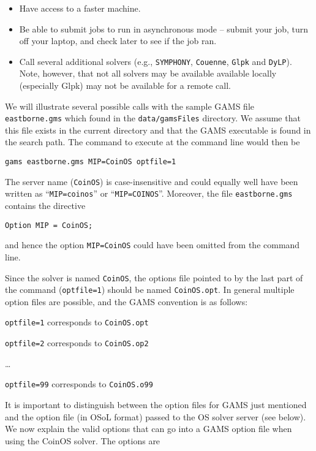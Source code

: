 \begin{itemize}
\item Have access to a faster machine.

\item  Be able to  submit jobs to run in asynchronous mode -- submit your job,  turn off your laptop,  
and check later to see if the job ran.

\item Call several additional solvers (e.g., {\tt SYMPHONY}, {\tt Couenne}, {\tt Glpk} and {\tt DyLP}).
Note, however, that not all solvers may be available available locally (especially Glpk) may not be available for a remote call.

\end{itemize}

We will illustrate several possible calls with the sample GAMS file {\tt eastborne.gms} which found in the
{\tt  data/gamsFiles} directory. We assume that this file exists in the current directory and that the GAMS executable is found in the search path. The command to execute at the command line would then be

\begin{verbatim} 
gams eastborne.gms MIP=CoinOS optfile=1
\end{verbatim}

The server name ({\tt CoinOS}) is case-insensitive and could equally well have been written as 
``{\tt MIP=coinos}'' or ``{\tt MIP=COINOS}''. Moreover, the file {\tt eastborne.gms} contains the directive

\begin{verbatim}
Option MIP = CoinOS;
\end{verbatim}

\noindent and hence the option {\tt MIP=CoinOS} could have been omitted from the command line.

Since the solver is named {\tt CoinOS}, the options file pointed to by the last part of the command
({\tt optfile=1}) should be named {\tt CoinOS.opt}. In general multiple option files are possible, and the GAMS convention is as follows:

{\tt optfile=1} corresponds to {\tt CoinOS.opt}

{\tt optfile=2} corresponds to {\tt CoinOS.op2}

{\ldots}

{\tt optfile=99} corresponds to {\tt CoinOS.o99}

\medskip
It is important to distinguish between the option files for GAMS just mentioned and the  option file (in OSoL format) passed to the OS solver server (see below).
We now explain the valid options that can go into a GAMS option file when using the CoinOS solver. 
The options are

